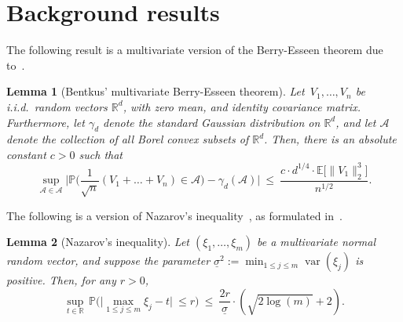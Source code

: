 \documentclass[aos,preprint]{imsart}
\numberwithin{equation}{section}
\theoremstyle{plain}
\newtheorem{lemma}{Lemma}[section]
\newcommand{\R}{\mathbb{R}}
\renewcommand{\P}{\mathbb{P}}
\newcommand{\E}{\mathbb{E}}
\newcommand{\var}{\operatorname{var}}
\newcommand{\ts}{\textstyle}
\newcommand{\1}{{\bf{1}}}
\newcommand{\0}{\mathbf{0}}
\begin{document}




\section{Background results} \label{app:background}
The following result is a multivariate version of the Berry-Esseen theorem due to~\cite{Bentkus:2003}. 
\begin{lemma}[Bentkus' multivariate Berry-Esseen theorem]\label{lem:bentkus}
\hspace{-0.4cm} Let\ $V_1,\dots,V_n$ be i.i.d.~random vectors $\R^d$, with zero mean, and identity covariance matrix. Furthermore, let $\gamma_d$ denote the standard Gaussian distribution on $\R^d$,  and let $\mathscr{A}$ denote the collection of all Borel convex subsets of $\R^d$. Then, there is an absolute constant $c>0$ such that
\begin{equation}
 \sup_{\mathcal{A}\in\mathscr{A}} \Big| \P\big(\ts\frac{1}{\sqrt{n}}(V_1+\dots+V_n)\in \mathcal{A}\big) -\gamma_d(\mathcal{A})\Big| \ \leq  \ \displaystyle \frac{c\cdot  d^{1/4}\cdot  \E\big[\|V_1\|_2^3\big]}{n^{1/2}}.
\end{equation}
\end{lemma}

\noindent The following is a version of Nazarov's inequality~\citep{Nazarov:2003,Klivans:2008}, as formulated in~\cite[Lemma 4.3]{CCK:SPA}.
\begin{lemma}[Nazarov's inequality]\label{lem:Nazarov}
Let $(\xi_1,\dots,\xi_m)$ be a multivariate normal random vector, and suppose the parameter $\underline{\sigma}^2:=\min_{1\leq j\leq m} \var(\xi_j)$ is positive. Then, for any $r>0$,
\begin{equation}
\sup_{t\in\R}\, \P\Big(\Big|\max_{1\leq j\leq m} \xi_j -t\Big| \ \leq r \Big)  \ \leq \  \frac{2r}{\underline{\sigma}}\cdot (\sqrt{2\log(m)}+2).
\end{equation}
\end{lemma}
\end{document}
